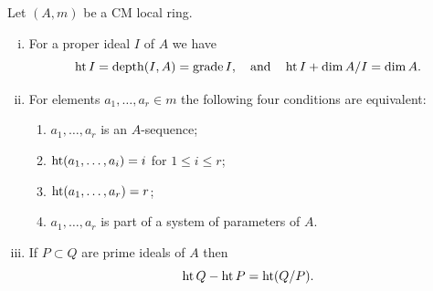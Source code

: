 \begin{theorem}\label{thm:17.4}
Let $(A, m)$ be a CM local ring.
\begin{enumerate}[(i)]
  \item For a proper ideal $I$ of $A$ we have
        \[
          \operatorname{ht} I = \operatorname{depth} (I, A) = \operatorname{grade} I, \quad \text{and} \quad \operatorname{ht} I + \dim A/I = \dim A.
        \]
  \item For elements $a_1, \ldots, a_r \in m$ the following four conditions are
        equivalent:
        \begin{enumerate}[(1)]
          \item $a_1, \ldots, a_r$ is an $A$-sequence;
          \item $\operatorname{ht}(a_1, \ldots, a_i) = i$ for $1 \le i \le r$;
          \item $\operatorname{ht}(a_1, \ldots, a_r) = r$;
          \item $a_1, \ldots, a_r$ is part of a system of parameters of $A$.
        \end{enumerate}
  \item If $P \subset Q$ are prime ideals of $A$ then
        \[
          \operatorname{ht} Q - \operatorname{ht} P = \operatorname{ht} (Q/P).
        \]
\end{enumerate}
\end{theorem}

